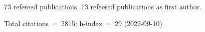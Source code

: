 73 refereed publications. 13 refeered publications as first author.

Total citations~=~2815; h-index~=~29 (2022-09-10)